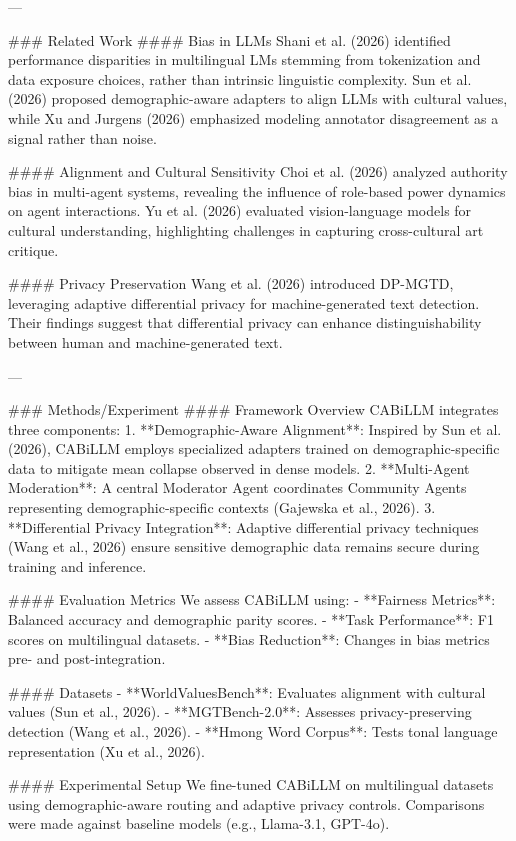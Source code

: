 ---

### Related Work  
#### Bias in LLMs  
Shani et al. (2026) identified performance disparities in multilingual LMs stemming from tokenization and data exposure choices, rather than intrinsic linguistic complexity. Sun et al. (2026) proposed demographic-aware adapters to align LLMs with cultural values, while Xu and Jurgens (2026) emphasized modeling annotator disagreement as a signal rather than noise.

#### Alignment and Cultural Sensitivity  
Choi et al. (2026) analyzed authority bias in multi-agent systems, revealing the influence of role-based power dynamics on agent interactions. Yu et al. (2026) evaluated vision-language models for cultural understanding, highlighting challenges in capturing cross-cultural art critique.

#### Privacy Preservation  
Wang et al. (2026) introduced DP-MGTD, leveraging adaptive differential privacy for machine-generated text detection. Their findings suggest that differential privacy can enhance distinguishability between human and machine-generated text.

---

### Methods/Experiment  
#### Framework Overview  
CABiLLM integrates three components:  
1. **Demographic-Aware Alignment**: Inspired by Sun et al. (2026), CABiLLM employs specialized adapters trained on demographic-specific data to mitigate mean collapse observed in dense models.  
2. **Multi-Agent Moderation**: A central Moderator Agent coordinates Community Agents representing demographic-specific contexts (Gajewska et al., 2026).  
3. **Differential Privacy Integration**: Adaptive differential privacy techniques (Wang et al., 2026) ensure sensitive demographic data remains secure during training and inference.

#### Evaluation Metrics  
We assess CABiLLM using:  
- **Fairness Metrics**: Balanced accuracy and demographic parity scores.  
- **Task Performance**: F1 scores on multilingual datasets.  
- **Bias Reduction**: Changes in bias metrics pre- and post-integration.

#### Datasets  
- **WorldValuesBench**: Evaluates alignment with cultural values (Sun et al., 2026).  
- **MGTBench-2.0**: Assesses privacy-preserving detection (Wang et al., 2026).  
- **Hmong Word Corpus**: Tests tonal language representation (Xu et al., 2026).

#### Experimental Setup  
We fine-tuned CABiLLM on multilingual datasets using demographic-aware routing and adaptive privacy controls. Comparisons were made against baseline models (e.g., Llama-3.1, GPT-4o).

